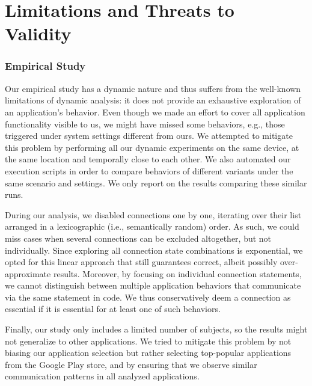 \vspace{0.05in}
\section{Limitations and Threats to \\Validity}
\label{sec:limitations}

\subsubsection{Empirical Study}
Our empirical study has a dynamic nature and thus suffers from the well-known limitations of dynamic analysis: it does not provide an exhaustive exploration of an application's behavior.
Even though we made an effort to cover all application functionality visible to us, we might have missed some behaviors, e.g., those triggered under system settings different from ours. 
We attempted to mitigate this problem by performing all our dynamic experiments on the same device, at the same location and temporally close to each other.  
We also automated our execution scripts in order to compare behaviors of different variants under the same scenario and settings. 
We only report on the results comparing these similar runs.  

During our analysis, we disabled connections one by one, iterating over their list arranged in a lexicographic (i.e., semantically random) order. As such, we could miss cases when 
several connections can be excluded altogether, but not individually. 
Since exploring all connection state combinations is exponential, we opted for this linear approach that still guarantees correct, 
albeit possibly over-approximate results. Moreover, by focusing on individual connection statements, we cannot distinguish between multiple application behaviors
that communicate via the same statement in code. We thus conservatively deem a connection as essential if it is essential for at least one of such behaviors. 
 
Finally, our study only includes a limited number of subjects, so the results might not generalize to other applications.
We tried to mitigate this problem by not biasing our application selection but rather selecting top-popular applications from the Google Play store, and by ensuring that we observe similar communication patterns in all analyzed applications.

